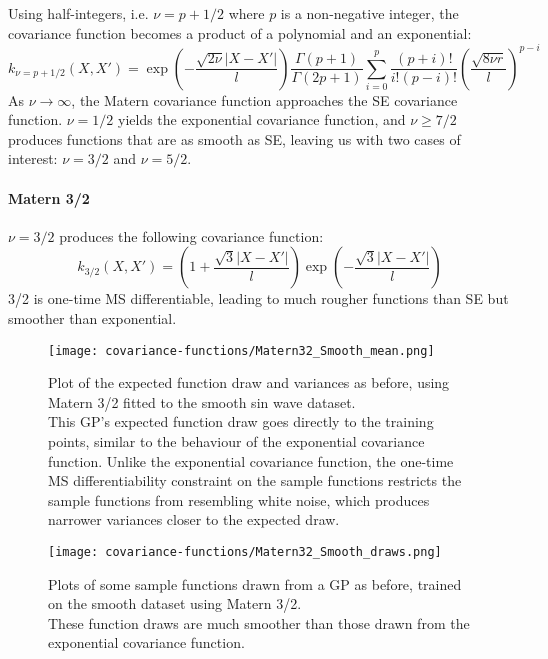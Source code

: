 Using half-integers, i.e. $\nu = p + 1/2$ where $p$ is a non-negative integer, the covariance function becomes a product of a polynomial and an exponential:
\begin{equation*}
    k_{\nu = p + 1/2}(X,X') = \exp \left(- \frac{\sqrt{2\nu}|X - X'|}{l} \right) \frac{\Gamma(p+1)}{\Gamma(2p+1)} \sum_{i=0}^p \frac{(p + i)!}{i!(p-i)!} \left( \frac{\sqrt{8\nu r}}{l} \right)^{p-i}
\end{equation*}
As $\nu \to \infty$, the Matern covariance function approaches the SE covariance function. $\nu = 1/2$ yields the exponential covariance function, and $\nu \geq 7/2$ produces functions that are as smooth as SE, leaving us with two cases of interest: $\nu = 3/2$ and $\nu = 5/2$.

\paragraph{Matern 3/2}
$\nu = 3/2$ produces the following covariance function:
\begin{equation} \label{eq:matern-32}
    k_{3/2}(X,X') = \left(1 + \frac{\sqrt{3}|X - X'|}{l} \right) \exp \left(-\frac{\sqrt{3}|X - X'|}{l} \right)
\end{equation}
3/2 is one-time MS differentiable, leading to much rougher functions than SE but smoother than exponential.

\begin{figure}[H]
    \texttt{[image: covariance-functions/Matern32\_Smooth\_mean.png]}
    \caption{
        Plot of the expected function draw and variances as before, using Matern 3/2 fitted to the smooth sin wave dataset. \\
        This GP's expected function draw goes directly to the training points, similar to the behaviour of the exponential covariance function. Unlike the exponential covariance function, the one-time MS differentiability constraint on the sample functions restricts the sample functions from resembling white noise, which produces narrower variances closer to the expected draw.
    }
\end{figure}

\begin{figure}[H]
    \texttt{[image: covariance-functions/Matern32\_Smooth\_draws.png]}
    \caption{
        Plots of some sample functions drawn from a GP as before, trained on the smooth dataset using Matern 3/2. \\
        These function draws are much smoother than those drawn from the exponential covariance function.
    }
\end{figure}

